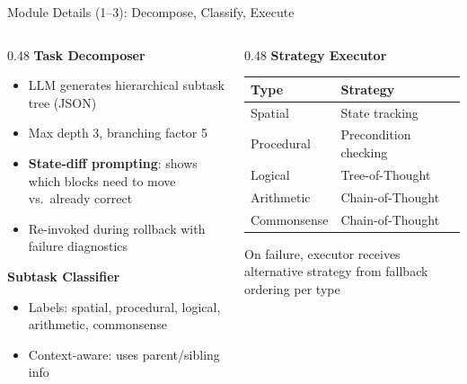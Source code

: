 \documentclass[aspectratio=169]{beamer}
\begin{document}
\begin{frame}{Module Details (1--3): Decompose, Classify, Execute}

\begin{columns}[T]
\begin{column}{0.48\textwidth}
\textbf{Task Decomposer}
\begin{itemize}
    \item LLM generates hierarchical subtask tree (JSON)
    \item Max depth 3, branching factor 5
    \item \textbf{State-diff prompting}: shows which blocks need to move vs.\ already correct
    \item Re-invoked during rollback with failure diagnostics
\end{itemize}

\vspace{0.2cm}
\textbf{Subtask Classifier}
\begin{itemize}
    \item Labels: spatial, procedural, logical, arithmetic, commonsense
    \item Context-aware: uses parent/sibling info
\end{itemize}
\end{column}

\begin{column}{0.48\textwidth}
\textbf{Strategy Executor}

\vspace{0.1cm}
\small
\begin{tabular}{ll}
\toprule
\textbf{Type} & \textbf{Strategy} \\
\midrule
Spatial & State tracking \\
Procedural & Precondition checking \\
Logical & Tree-of-Thought \\
Arithmetic & Chain-of-Thought \\
Commonsense & Chain-of-Thought \\
\bottomrule
\end{tabular}
\normalsize

\vspace{0.3cm}
On failure, executor receives alternative strategy from fallback ordering per type
\end{column}
\end{columns}

\end{frame}
\end{document}
